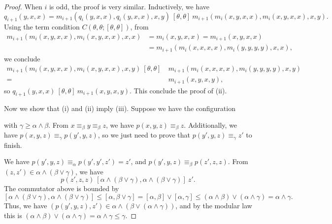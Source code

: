 \documentclass[letterpaper,11pt]{article}
\begin{document}
\begin{proof}
When $i$ is odd, the proof is very similar. Inductively, we have
\[
q_{i+1}(y,x,x) = m_{i+1}(q_i(y,x,x),q_i(y,x,x),x,y)\ [\theta,\theta]\ m_{i+1}(m_i(x,y,x,x),m_i(x,y,x,x),x,y).
\]
Using the term condition $C(\theta,\theta;[\theta,\theta])$, from
\begin{align*}
m_{i+1}(m_i(x,y,x,x),m_i(x,y,x,x),x,\boxed{x}) &= m_i(x,y,x,x) = m_{i+1}(x,y,x,x)\\
&= m_{i+1}(m_i(x,x,x,x),m_i(y,y,y,y),x,\boxed{x}),
\end{align*}
we conclude
\begin{align*}
m_{i+1}(m_i(x,y,x,x),m_i(x,y,x,x),x,\boxed{y})\ [\theta,\theta]\ &m_{i+1}(m_i(x,x,x,x),m_i(y,y,y,y),x,\boxed{y})\\
=\ &m_{i+1}(x,y,x,y),
\end{align*}
so $q_{i+1}(y,x,x)\ [\theta,\theta]\ m_{i+1}(x,y,x,y)$. This conclude the proof of (ii).

Now we show that (i) and (ii) imply (iii). Suppose we have the configuration
\begin{center}
\end{center}
with $\gamma \ge \alpha \wedge \beta$. From $x \equiv_\beta y \equiv_\beta z$, we have $p(x,y,z) \equiv_\beta z$. Additionally, we have $p(x,y,z) \equiv_\gamma p(y',y,z)$, so we just need to prove that $p(y',y,z) \equiv_\gamma z'$ to finish.

We have $p(y',y,z) \equiv_\alpha p(y',y',z') = z'$, and $p(y',y,z) \equiv_\beta p(z',z,z)$. From $(z,z') \in \alpha \wedge (\beta \vee \gamma)$, we have
\[
p(z',z,z)\ [\alpha\wedge (\beta\vee \gamma),\alpha \wedge (\beta \vee \gamma)]\ z'.
\]
The commutator above is bounded by
\[
[\alpha\wedge (\beta\vee \gamma),\alpha \wedge (\beta \vee \gamma)] \le [\alpha, \beta \vee \gamma] = [\alpha,\beta] \vee [\alpha,\gamma] \le (\alpha \wedge \beta) \vee (\alpha \wedge \gamma) = \alpha \wedge \gamma.
\]
Thus, we have $(p(y',y,z), z') \in \alpha \wedge (\beta \vee (\alpha \wedge \gamma))$, and by the modular law this is $(\alpha \wedge \beta) \vee (\alpha \wedge \gamma) = \alpha \wedge \gamma \le \gamma$.


\end{proof}
\end{document}
